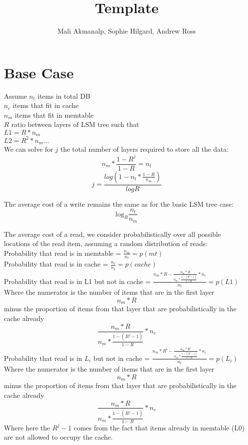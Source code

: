 \documentclass[11pt]{article}
\theoremstyle{plain}
\theoremstyle{definition}
\begin{document}
 


\title{Template}
\author{Mali Akmanalp, Sophie Hilgard, Andrew Ross}
\maketitle

\section{Base Case}

Assume
$n_t$ items in total DB \\
$n_c$ items that fit in cache\\
$n_m$ items that fit in memtable\\
$R$ ratio between layers of LSM tree such that \\
$L1 = R * n_m$ \\
$L2 = R^2 * n_m \dots$ \\ 

We can solve for $j$ the total number of layers required to store all the data: \\
$$n_m * \frac{1-R^j}{1-R} = n_t$$
$$j = \frac{log(1-n_t*\frac{1-R}{n_m})}{log R}$$

The average cost of a write remains the same as for the basic LSM tree case:
$$
\textrm{log}_{R} \frac{n_t}{n_m}
$$

The average cost of a read, we consider probabilistically over all possible locations of the read item, assuming a random distribution of reads: \\
Probability that read is in memtable = $\frac{n_m}{n_t}  = p(mt)$\\
Probability that read is in cache = $\frac{n_c}{n_t} = p(cache)$ \\
Probability that read is in L1 but not in cache = $ \frac{n_m * R - \frac{n_m * R}{n_m * \frac{1-(R^j-1)}{1-R}} * n_c}{n_t}  = p(L1)$\\
Where the numerator is the number of items that are in the first layer $$n_m * R$$ minus the proportion of items from that layer that are probabilistically in the cache already $$\frac{n_m * R}{n_m * \frac{1-(R^j-1)}{1-R}} * n_c$$
Probability that read is in $L_i$ but not in cache = $ \frac{n_m * R^i - \frac{n_m * R^i}{n_m * \frac{1-(R^j-1)}{1-R}} * n_c}{n_t}  = p(L_i)$\\
Where the numerator is the number of items that are in the first layer $$n_m * R$$ minus the proportion of items from that layer that are probabilistically in the cache already $$\frac{n_m * R}{n_m * \frac{1-(R^j-1)}{1-R}} * n_c$$
Where here the $R^j -1$ comes from the fact that items already in memtable (L0) are not allowed to occupy the cache.
\end{document}
